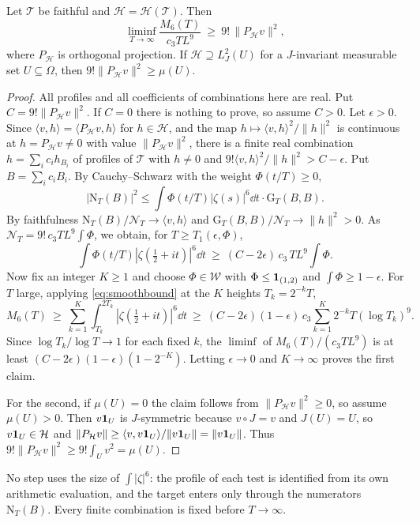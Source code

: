 \documentclass[11pt,colorlinks]{charlie}
\newcommand{\Om}{\Omega}
\newcommand{\ip}[2]{\langle #1,#2\rangle}
\begin{document}
\begin{proposition}\label{prop:projection}
Let $\mathcal T$ be faithful and $\mathcal H=\mathcal H(\mathcal T)$. Then
\[
 \liminf_{T\to\infty}\frac{M_6(T)}{c_3TL^9}\ \ge\ 9!\,\|P_{\mathcal H}v\|^2 ,
\]
where $P_{\mathcal H}$ is orthogonal projection. If $\mathcal H\supseteq L^2_J(U)$ for a $J$-invariant measurable set $U\subseteq\Om$, then $9!\|P_{\mathcal H}v\|^2\ge\mu(U)$.
\end{proposition}
\begin{proof}
All profiles and all coefficients of combinations here are real. Put $C=9!\|P_{\mathcal H}v\|^2$. If $C=0$ there is nothing to prove, so assume $C>0$. Let $\epsilon>0$. Since $\ip{v}{h}=\ip{P_{\mathcal H}v}{h}$ for $h\in\mathcal H$, and the map $h\mapsto\ip{v}{h}^2/\|h\|^2$ is continuous at $h=P_{\mathcal H}v\ne0$ with value $\|P_{\mathcal H}v\|^2$, there is a finite real combination $h=\sum_ic_ih_{B_i}$ of profiles of $\mathcal T$ with $h\ne0$ and $9!\ip{v}{h}^2/\|h\|^2>C-\epsilon$. Put $B=\sum_ic_iB_i$. By Cauchy--Schwarz with the weight $\Phi(t/T)\ge0$,
\[
 |\mathrm N_T(B)|^2\le\int\Phi(t/T)|\zeta(s)|^6\dd t\cdot\mathrm G_T(B,B).
\]
By faithfulness $\mathrm N_T(B)/\mathcal N_T\to\ip vh$ and $\mathrm G_T(B,B)/\mathcal N_T\to\|h\|^2>0$. As $\mathcal N_T=9!\,c_3TL^9\int\Phi$, we obtain, for $T\ge T_1(\epsilon,\Phi)$,
\begin{equation}\label{eq:smoothbound}
 \int\Phi(t/T)|\zeta(\tfrac12+it)|^6\dd t\ \ge\ (C-2\epsilon)\,c_3\,TL^9\!\int\Phi .
\end{equation}
Now fix an integer $K\ge1$ and choose $\Phi\in\mathcal W$ with $\Phi\le\mathbf{1}_{(1,2)}$ and $\int\Phi\ge1-\epsilon$. For $T$ large, applying \eqref{eq:smoothbound} at the $K$ heights $T_k=2^{-k}T$,
\[
 M_6(T)\ \ge\ \sum_{k=1}^{K}\int_{T_k}^{2T_k}|\zeta(\tfrac12+it)|^6\dd t\ \ge\ (C-2\epsilon)(1-\epsilon)\,c_3\sum_{k=1}^K2^{-k}T(\log T_k)^9 .
\]
Since $\log T_k/\log T\to1$ for each fixed $k$, the $\liminf$ of $M_6(T)/(c_3TL^9)$ is at least $(C-2\epsilon)(1-\epsilon)(1-2^{-K})$. Letting $\epsilon\to0$ and $K\to\infty$ proves the first claim.

For the second, if $\mu(U)=0$ the claim follows from $\|P_{\mathcal H}v\|^2\ge0$, so assume $\mu(U)>0$. Then $v\mathbf{1}_U$ is $J$-symmetric because $v\circ J=v$ and $J(U)=U$, so $v\mathbf{1}_U\in\mathcal H$ and $\|P_{\mathcal H}v\|\ge\ip{v}{v\one_U}/\|v\one_U\|=\|v\one_U\|$. Thus $9!\|P_{\mathcal H}v\|^2\ge9!\int_Uv^2=\mu(U)$.
\end{proof}

No step uses the size of $\int|\zeta|^6$: the profile of each test is identified from its own arithmetic evaluation, and the target enters only through the numerators $\mathrm N_T(B)$. Every finite combination is fixed before $T\to\infty$.
\end{document}
